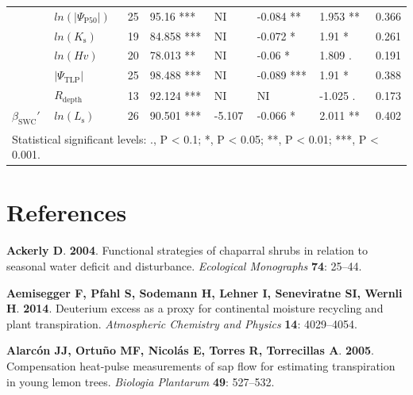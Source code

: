 \documentclass[11pt,twoside]{reedthesis}
\begin{document}
\begin{table}[H]
{\begin{tabular}[t]{llrllllr}
\cmidrule{1-8}
 & $ln(\rvert\Psi_{\text{P50}}\rvert)$ & 25 & 95.16 *** & NI & -0.084 ** & 1.953 ** & 0.366\\
\cmidrule{2-8}
 & $ln(K_{\text{s}})$ & 19 & 84.858 *** & NI & -0.072 * & 1.91 * & 0.261\\
\cmidrule{2-8}
 & $ln(Hv)$ & 20 & 78.013 ** & NI & -0.06 * & 1.809 . & 0.191\\
\cmidrule{2-8}
 & $\rvert\Psi_{\text{TLP}}\rvert$ & 25 & 98.488 *** & NI & -0.089 *** & 1.91 * & 0.388\\
\cmidrule{2-8}
 & $R_{\text{depth}}$ & 13 & 92.124 *** & NI & NI & -1.025 . & 0.173\\
\cmidrule{2-8}
\multirow{-6}{*}{\raggedright\arraybackslash $\beta_{\text{SWC}}'$} & $ln(L_{\text{s}})$ & 26 & 90.501 *** & -5.107 & -0.066 * & 2.011 ** & 0.402\\
\bottomrule
\multicolumn{8}{l}{\textsuperscript{} Statistical significant levels: ., P < 0.1; *, P < 0.05; **, P < 0.01; ***, P < 0.001.}\\
\end{tabular}}
\end{table}
\chapter*{References}\label{references}


\noindent

\setlength{\parindent}{-0.20in} \setlength{\leftskip}{0.20in}
\setlength{\parskip}{8pt}

\hypertarget{refs}{}
\hypertarget{ref-Ackerly2004}{}
\textbf{\textnormal{Ackerly D}}. \textbf{2004}. Functional strategies of
chaparral shrubs in relation to seasonal water deficit and disturbance.
\emph{Ecological Monographs} \textbf{74}: 25--44.

\hypertarget{ref-Aemisegger2014}{}
\textbf{\textnormal{Aemisegger F}, \textnormal{Pfahl S},
\textnormal{Sodemann H}, \textnormal{Lehner I}, \textnormal{Seneviratne
SI}, \textnormal{Wernli H}}. \textbf{2014}. Deuterium excess as a proxy
for continental moisture recycling and plant transpiration.
\emph{Atmospheric Chemistry and Physics} \textbf{14}: 4029--4054.

\hypertarget{ref-Alarcon2005}{}
\textbf{\textnormal{Alarcón JJ}, \textnormal{Ortuño MF},
\textnormal{Nicolás E}, \textnormal{Torres R}, \textnormal{Torrecillas
A}}. \textbf{2005}. Compensation heat-pulse measurements of sap flow for
estimating transpiration in young lemon trees. \emph{Biologia Plantarum}
\textbf{49}: 527--532.
\end{document}
